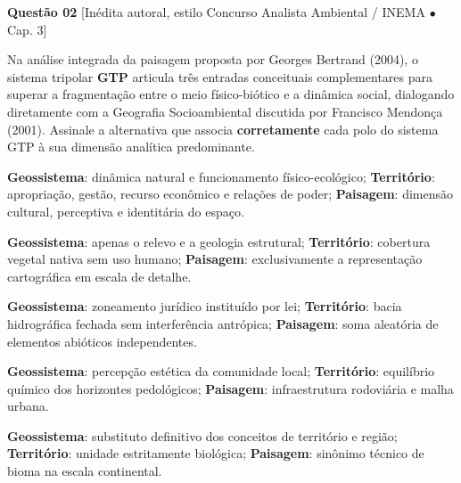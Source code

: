 \vspace{6pt}
\noindent\textbf{Questão 02} {\footnotesize\color{uefsMuted}[Inédita autoral, estilo Concurso Analista Ambiental / INEMA $\bullet$ Cap. 3]}\par
Na análise integrada da paisagem proposta por Georges Bertrand (2004), o sistema tripolar \textbf{GTP} articula três entradas conceituais complementares para superar a fragmentação entre o meio físico-biótico e a dinâmica social, dialogando diretamente com a Geografia Socioambiental discutida por Francisco Mendonça (2001). Assinale a alternativa que associa \textbf{corretamente} cada polo do sistema GTP à sua dimensão analítica predominante.
\begin{alternativas}
  \item \textbf{Geossistema}: dinâmica natural e funcionamento físico-ecológico; \textbf{Território}: apropriação, gestão, recurso econômico e relações de poder; \textbf{Paisagem}: dimensão cultural, perceptiva e identitária do espaço.
  \item \textbf{Geossistema}: apenas o relevo e a geologia estrutural; \textbf{Território}: cobertura vegetal nativa sem uso humano; \textbf{Paisagem}: exclusivamente a representação cartográfica em escala de detalhe.
  \item \textbf{Geossistema}: zoneamento jurídico instituído por lei; \textbf{Território}: bacia hidrográfica fechada sem interferência antrópica; \textbf{Paisagem}: soma aleatória de elementos abióticos independentes.
  \item \textbf{Geossistema}: percepção estética da comunidade local; \textbf{Território}: equilíbrio químico dos horizontes pedológicos; \textbf{Paisagem}: infraestrutura rodoviária e malha urbana.
  \item \textbf{Geossistema}: substituto definitivo dos conceitos de território e região; \textbf{Território}: unidade estritamente biológica; \textbf{Paisagem}: sinônimo técnico de bioma na escala continental.
\end{alternativas}

